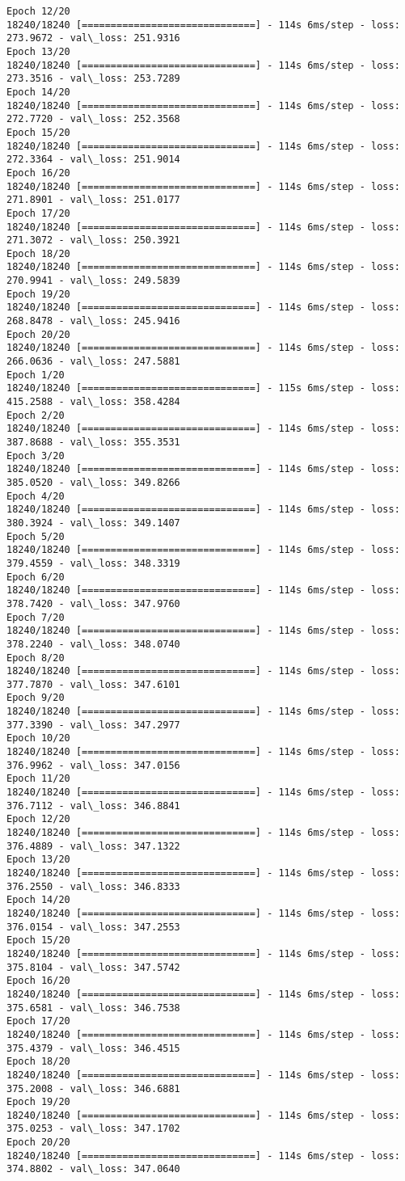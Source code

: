\documentclass[11pt]{article}
\begin{document}
\begin{Verbatim}[commandchars=\\\{\}]
Epoch 12/20
18240/18240 [==============================] - 114s 6ms/step - loss: 273.9672 - val\_loss: 251.9316
Epoch 13/20
18240/18240 [==============================] - 114s 6ms/step - loss: 273.3516 - val\_loss: 253.7289
Epoch 14/20
18240/18240 [==============================] - 114s 6ms/step - loss: 272.7720 - val\_loss: 252.3568
Epoch 15/20
18240/18240 [==============================] - 114s 6ms/step - loss: 272.3364 - val\_loss: 251.9014
Epoch 16/20
18240/18240 [==============================] - 114s 6ms/step - loss: 271.8901 - val\_loss: 251.0177
Epoch 17/20
18240/18240 [==============================] - 114s 6ms/step - loss: 271.3072 - val\_loss: 250.3921
Epoch 18/20
18240/18240 [==============================] - 114s 6ms/step - loss: 270.9941 - val\_loss: 249.5839
Epoch 19/20
18240/18240 [==============================] - 114s 6ms/step - loss: 268.8478 - val\_loss: 245.9416
Epoch 20/20
18240/18240 [==============================] - 114s 6ms/step - loss: 266.0636 - val\_loss: 247.5881
Epoch 1/20
18240/18240 [==============================] - 115s 6ms/step - loss: 415.2588 - val\_loss: 358.4284
Epoch 2/20
18240/18240 [==============================] - 114s 6ms/step - loss: 387.8688 - val\_loss: 355.3531
Epoch 3/20
18240/18240 [==============================] - 114s 6ms/step - loss: 385.0520 - val\_loss: 349.8266
Epoch 4/20
18240/18240 [==============================] - 114s 6ms/step - loss: 380.3924 - val\_loss: 349.1407
Epoch 5/20
18240/18240 [==============================] - 114s 6ms/step - loss: 379.4559 - val\_loss: 348.3319
Epoch 6/20
18240/18240 [==============================] - 114s 6ms/step - loss: 378.7420 - val\_loss: 347.9760
Epoch 7/20
18240/18240 [==============================] - 114s 6ms/step - loss: 378.2240 - val\_loss: 348.0740
Epoch 8/20
18240/18240 [==============================] - 114s 6ms/step - loss: 377.7870 - val\_loss: 347.6101
Epoch 9/20
18240/18240 [==============================] - 114s 6ms/step - loss: 377.3390 - val\_loss: 347.2977
Epoch 10/20
18240/18240 [==============================] - 114s 6ms/step - loss: 376.9962 - val\_loss: 347.0156
Epoch 11/20
18240/18240 [==============================] - 114s 6ms/step - loss: 376.7112 - val\_loss: 346.8841
Epoch 12/20
18240/18240 [==============================] - 114s 6ms/step - loss: 376.4889 - val\_loss: 347.1322
Epoch 13/20
18240/18240 [==============================] - 114s 6ms/step - loss: 376.2550 - val\_loss: 346.8333
Epoch 14/20
18240/18240 [==============================] - 114s 6ms/step - loss: 376.0154 - val\_loss: 347.2553
Epoch 15/20
18240/18240 [==============================] - 114s 6ms/step - loss: 375.8104 - val\_loss: 347.5742
Epoch 16/20
18240/18240 [==============================] - 114s 6ms/step - loss: 375.6581 - val\_loss: 346.7538
Epoch 17/20
18240/18240 [==============================] - 114s 6ms/step - loss: 375.4379 - val\_loss: 346.4515
Epoch 18/20
18240/18240 [==============================] - 114s 6ms/step - loss: 375.2008 - val\_loss: 346.6881
Epoch 19/20
18240/18240 [==============================] - 114s 6ms/step - loss: 375.0253 - val\_loss: 347.1702
Epoch 20/20
18240/18240 [==============================] - 114s 6ms/step - loss: 374.8802 - val\_loss: 347.0640


\end{Verbatim}
\end{document}
